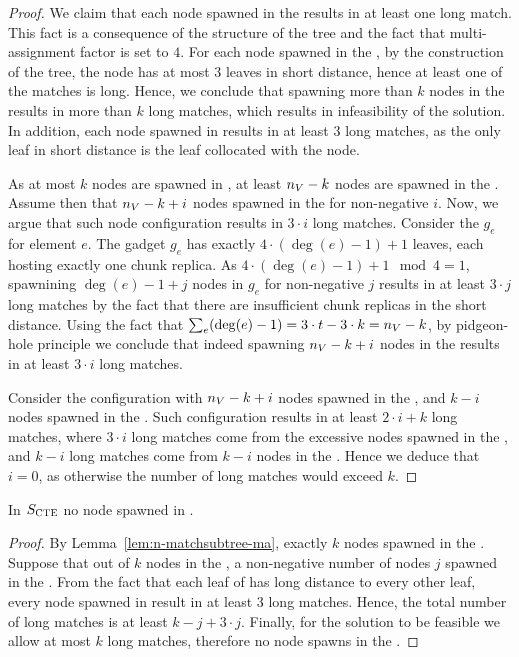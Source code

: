 \begin{proof}
 We claim that each node spawned in the \MatchSubtree{} results in at least one long match.
This fact is a consequence of the structure of the tree and the fact that multi-assignment factor is set to $4$.
For each node spawned in the \MatchSubtree{}, by the construction of the tree, the node has at most $3$ leaves in short distance, hence at least one of the matches is long.
Hence, we conclude that spawning more than $k$ nodes in the \MatchSubtree{} results in more than $k$ long matches, which results in infeasibility of the solution.
In addition, each node spawned in \UnqGadget{} results in at least $3$ long matches, as the only leaf in short distance is the leaf collocated with the node.

As at most $k$ nodes are spawned in \MatchSubtree{}, at least $n_V-k$ nodes are spawned in the \CoverSubtree.
Assume then that $n_V-k+i$ nodes spawned in the \CoverSubtree{} for non-negative $i$.
Now, we argue that such node configuration results in $3\cdot i$ long matches.
Consider the \ElGadget{} $g_e$ for element $e$.
The gadget $g_e$ has exactly $4\cdot(\deg(e)-1)+1$ leaves, each hosting exactly one chunk replica.
As $4\cdot(\deg(e)-1)+1 \mod 4 = 1$, spawnining $\deg(e)-1+j$ nodes in $g_e$ for non-negative $j$ results in at least $3\cdot j$ long matches by the fact that there are insufficient chunk replicas in the short distance.
Using the fact that $\sum_e(\deg(e)-1) = 3\cdot t - 3\cdot k = n_V - k$, by pidgeon-hole principle we conclude that indeed spawning $n_V-k+i$ nodes in the \CoverSubtree{} results in at least $3\cdot i$ long matches.

Consider the configuration with $n_V-k+i$ nodes spawned in the \CoverSubtree{}, and $k-i$ nodes spawned in the \MatchSubtree{}.
Such configuration results in at least $2\cdot i + k$ long matches, where $3\cdot i$ long matches come from the excessive nodes spawned in the \CoverSubtree{}, and $k-i$ long matches come from $k-i$ nodes in the \MatchSubtree{}.
Hence we deduce that $i = 0$, as otherwise the number of long matches would exceed $k$.

\end{proof}

\begin{lemma}
  In $S_{\mathrm{\textsc{CTE}}}$ no node spawned in \UnqGadget{}.
  \label{lem:no-unq-ma}
\end{lemma}
\begin{proof}
  By Lemma~\ref{lem:n-matchsubtree-ma}, exactly $k$ nodes spawned in the \MatchSubtree{}.
Suppose that out of $k$ nodes in the \MatchSubtree{}, a non-negative number of nodes $j$ spawned in the \UnqGadgets{}.
From the fact that each leaf of \UnqGadget{} has long distance to every other leaf, every node spawned in \UnqGadget{} result in at least $3$ long matches.
Hence, the total number of long matches is at least $k-j + 3\cdot j$.
Finally, for the solution to be feasible we allow at most $k$ long matches, therefore no node spawns in the \UnqGadget{}.
\end{proof}

